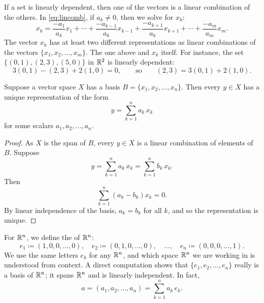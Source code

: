 If a set is linearly dependent, then one of the
vectors is a linear combination of the others.
In \eqref{eq:lincomb},
if $a_k \not= 0$, then we solve for $x_k$:
\begin{equation*}
x_k = \frac{-a_1}{a_k} x_1 + \cdots + 
\frac{-a_{k-1}}{a_k} x_{k-1} +
\frac{-a_{k+1}}{a_k} x_{k+1} +
\cdots + 
\frac{-a_m}{a_m} x_m .
\end{equation*}
The vector $x_k$ has at least two different representations
as linear combinations of the vectors $\{ x_1,x_2,\ldots,x_m \}$. The one above and
$x_k$ itself. 
For instance, the set $\bigl\{ (0,1), (2,3), (5,0) \bigr\}$ in ${\mathbb{R}}^2$ is linearly dependent:
\begin{equation*}
3(0,1) - (2,3) + 2(1,0) = 0 ,
\qquad \text{so} \qquad
(2,3) = 3(0,1) + 2(1,0) .
\end{equation*}

\begin{prop}
Suppose a vector space $X$ has a basis 
$B = \{ x_1, x_2, \ldots, x_n \}$.  Then
every $y \in X$ has a unique representation of the form
\begin{equation*}
y = \sum_{k=1}^n a_k \, x_k
\end{equation*}
for some scalars $a_1, a_2, \ldots, a_n$.
\end{prop}

\begin{proof}
As $X$ is the span of $B$,
every $y \in X$ is a linear combination of elements of $B$.
Suppose
\begin{equation*}
y = \sum_{k=1}^n a_k \, x_k = \sum_{k=1}^n b_k \, x_k .
\end{equation*}
Then
\begin{equation*}
\sum_{k=1}^n (a_k-b_k) x_k = 0 .
\end{equation*}
By linear independence of the basis, $a_k = b_k$ for all $k$, and so
the representation is unique.
\end{proof}

For ${\mathbb{R}}^n$,
we define
the \emph{} of ${\mathbb{R}}^n$:
\begin{equation*}
e_1 \coloneqq (1,0,0,\ldots,0) , \quad
e_2 \coloneqq (0,1,0,\ldots,0) , \quad \ldots, \quad
e_n \coloneqq (0,0,0,\ldots,1) .
\end{equation*}
We use the same letters $e_k$ for any ${\mathbb{R}}^n$, and
which space ${\mathbb{R}}^n$ we are working in is understood from context.
A direct computation shows that $\{ e_1, e_2, \ldots, e_n \}$ really is
a basis of ${\mathbb{R}}^n$; it spans ${\mathbb{R}}^n$ and is
linearly independent.  In fact,
\begin{equation*}
a = (a_1,a_2,\ldots,a_n) = \sum_{k=1}^n a_k \, e_k .
\end{equation*}


